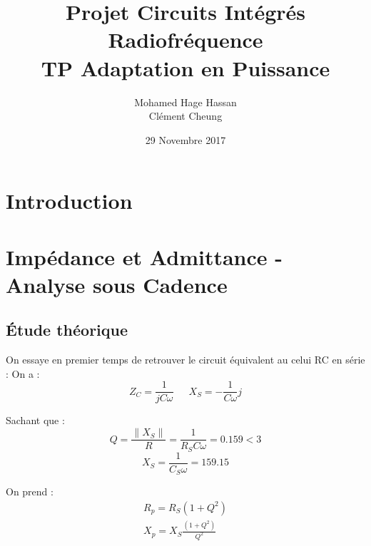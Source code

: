 \documentclass[a4paper]{article}
\begin{document}
\newcommand\textstyleEmphasis[1]{\textit{#1}}
\renewcommand{\contentsname}{Table des mati\`eres}
\renewcommand\refname{R\'ef\'erences}

\renewcommand{\abstractname}{Pr\'eambule}
\title{\textbf{Projet Circuits Int\'egr\'es Radiofr\'equence \\ TP Adaptation en Puissance}}
\author{Mohamed Hage Hassan \\ Cl\'ement Cheung}
\date{29 Novembre 2017}
\maketitle
\thispagestyle{empty}

\tableofcontents
\clearpage

\section{Introduction}

\section{Imp\'edance et Admittance - Analyse sous Cadence}
\subsection{\'Etude th\'eorique}

On essaye en premier temps de retrouver le circuit \'equivalent au celui RC en s\'erie :
On a :
\begin{equation}
  Z_C = \frac{1}{jC\omega} \phantom{8} \phantom{8} \phantom{8} X_S = - \frac{1}{C\omega}j
\end{equation}

Sachant que :
\[
Q = \frac{\|X_S \|}{R} = \frac{1}{R_S C\omega} = 0.159 < 3
\]
\[
X_S = \frac{1}{C_S \omega} = 159.15
\]

On prend :
\begin{equation}
  \begin{split}
  R_p = R_S (1 + Q^2) \\
  X_p = X_S \frac{(1+Q^2)}{Q^2}
  \end{split}
\end{equation}
\end{document}
